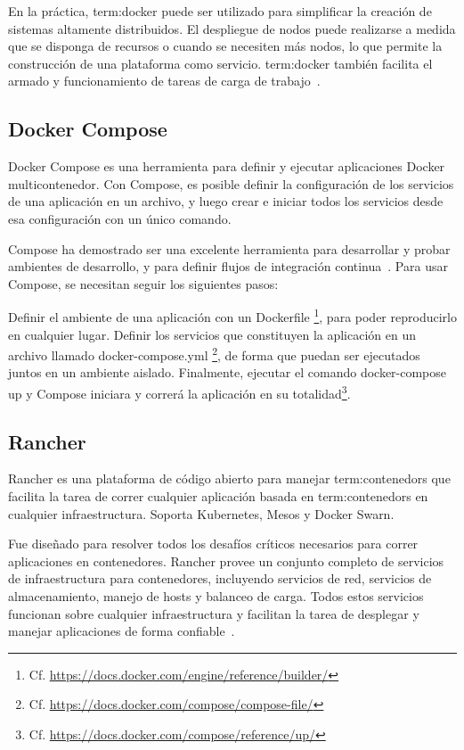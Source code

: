 En la práctica, \gls{term:docker} puede ser utilizado para simplificar la
creación de sistemas altamente distribuidos. El despliegue de nodos puede
realizarse a medida que se disponga de recursos o cuando se necesiten más
nodos, lo que permite la construcción de una plataforma como servicio.
\gls{term:docker} también facilita el armado y funcionamiento de tareas de
carga de trabajo~\cite{docker}.

\subsection{Docker Compose}
\label{anexo_compose}

Docker Compose es una herramienta para definir y ejecutar aplicaciones Docker
multicontenedor. Con Compose, es posible definir la configuración de los
servicios de una aplicación en un archivo, y luego crear e iniciar todos los
servicios desde esa configuración con un único comando.

Compose ha demostrado ser una excelente herramienta para desarrollar y probar
ambientes de desarrollo, y para definir flujos de integración
continua~\cite{compose}. Para usar Compose, se necesitan seguir los siguientes
pasos:

Definir el ambiente de una aplicación con un Dockerfile
\footnote{Cf. \url{https://docs.docker.com/engine/reference/builder/}}, para
poder reproducirlo en cualquier lugar.  Definir los servicios que constituyen
la aplicación en un archivo llamado docker-compose.yml
\footnote{Cf.  \url{https://docs.docker.com/compose/compose-file/}}, de forma
que puedan ser ejecutados juntos en un ambiente aislado.  Finalmente, ejecutar
el comando docker-compose up y Compose iniciara y correrá la aplicación en su
totalidad\footnote{Cf. \url{https://docs.docker.com/compose/reference/up/}}.


\subsection{Rancher}

Rancher es una plataforma de código abierto para manejar
\glspl{term:contenedor} que facilita la tarea de correr cualquier aplicación
basada en \glspl{term:contenedor} en cualquier infraestructura. Soporta
Kubernetes, Mesos y Docker Swarn.

Fue diseñado para resolver todos los desafíos críticos necesarios para correr
aplicaciones en contenedores. Rancher provee un conjunto completo de servicios
de infraestructura para contenedores, incluyendo servicios de red, servicios de
almacenamiento, manejo de hosts y balanceo de carga. Todos estos servicios
funcionan sobre cualquier infraestructura y facilitan la tarea de desplegar y
manejar aplicaciones de forma confiable~\cite{rancher}.

